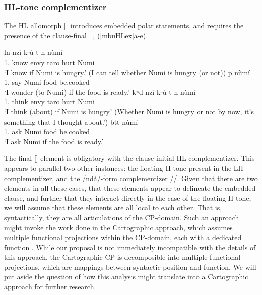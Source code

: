 \documentclass[output=paper,colorlinks,citecolor=brown]{langscibook}
\begin{document}
\subsubsection{HL-tone complementizer} \label{secHL}

The HL allomorph [\mbuHL] introduces embedded polar statements, and requires the presence of the clause-final [\la], (\ref{mbuHLex}a-e).

\ea \label{mbuHLex}
    \begin{xlist}
    \ex \label{mbuHLexa}
         {l\epH n} {\mbuHL} {nzì} {kʰ{ú}} {\epL\epH t} {n\dz\epH} {n{ù}m{í}} {\ds\la} \\
             {1.} {know} {} {envy} {taro} {} {hurt} {Numi} {} \\
        \glt `I know if Numi is hungry.' (I can tell whether Numi is hungry (or not))
    \ex \label{mbuHLexb}
         {p} {n{ù}m{í}} {\mbuHL} {\ch\schwaL{}} {\ds\textscb\schwaH} {\ds\la}\\
             {1.} {say} {Numi} {} {food} {be.cooked} {}\\
        \glt `I wonder (to Numi) if the food is ready.'
    \ex \label{mbuHLexc}
         {kʷ\epL d\schwaL} {\mbuL} {nzì} {kʰ{ú}} {\epL\epH t} {n\dz\epH} {n{ù}m{í}} {\ds\la} \\
             {1.} {think} {} {envy} {taro} {} {hurt} {Numi} {} \\
        \glt `I think (about) if Numi is hungry.' (Whether Numi is hungry or not by now, it's something that I thought about.')
    \ex \label{mbuHLexd}
         {b\epH tt\schwaH} {n{ù}m{í}} {\mbuL} {\ch\schwaL{}} {\ds\textscb\schwaH} {\ds\la} \\
             {1.} {ask} {Numi} {} {food} {be.cooked} {} \\
        \glt `I ask Numi if the food is ready.'
    \end{xlist}
\z

The final [\la] element is obligatory with the clause-initial HL-complementizer. This appears to parallel two other instances: the floating H-tone present in the LH-complementizer, and the /nd{à}/-form complementizer /\la/. Given that there are two elements in all these cases, that these elements appear to delineate the embedded clause, and further that they interact directly in the case of the floating H tone, we will assume that these elements are all local to each other. That is, syntactically, they are all articulations of the CP-domain. Such an approach might invoke the work done in the Cartographic approach, which assumes multiple functional projections within the CP-domain, each with a dedicated function \citep{Rizzi1997}. While our proposal is not immediately incompatible with the details of this approach, the Cartographic CP is decomposible into multiple functional projections, which are mappings between syntactic position and function. We will put aside the question of how this analysis might translate into a Cartographic approach for further research.
\end{document}
